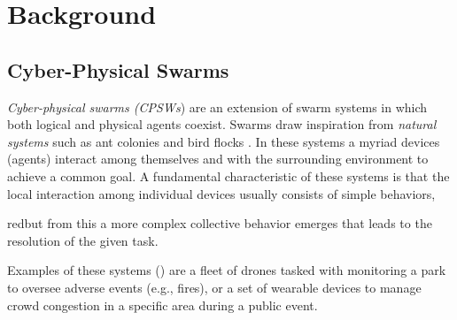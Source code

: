 \documentclass[12pt,a4paper,openright,twoside]{book}
\begin{document}
\chapter{Background}
\label{chap:background}

\section{Cyber-Physical Swarms}

\emph{Cyber-physical swarms (CPSWs}) are an extension of swarm systems in which both logical and
    physical agents coexist. Swarms draw inspiration from \emph{natural systems} such as ant colonies 
    and bird flocks \cite{tan2013swarm, roy2014nature, bonabeau1999swarm}. In these systems a myriad devices (agents) interact among themselves and with the surrounding 
    environment to achieve a common goal. A fundamental characteristic of these systems is that the local 
    interaction among individual devices usually consists of simple behaviors, \begin{color}{red}but from this a more 
    complex collective behavior emerges that leads to the resolution of the given task. \end{color}Examples of these systems () are a fleet of drones tasked with monitoring a park to 
    oversee adverse events (e.g., fires), or a set of wearable devices to manage crowd congestion in a specific area during a public event.
\end{document}
